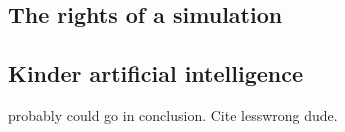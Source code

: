 \autocite{faggella_preventing_2019}
\autocite{singler_existential_2019}
 
\subsection{The rights of a simulation}

\subsection{Kinder artificial intelligence}
probably could go in conclusion. Cite lesswrong dude.

